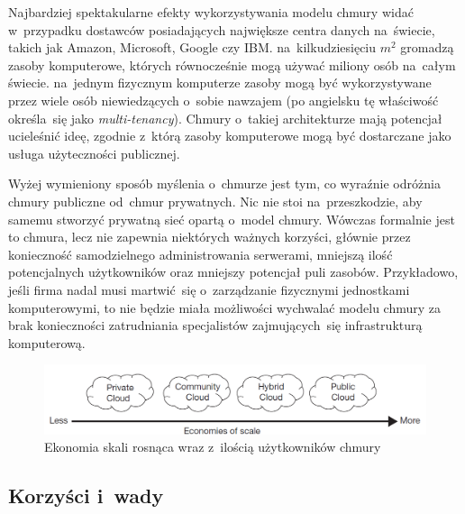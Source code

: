 \documentclass[12pt,a4paper,twoside,titlepage,openright]{book}
\begin{document}
Najbardziej spektakularne efekty wykorzystywania modelu chmury widać w~przypadku dostawców posiadających największe centra danych na~świecie, takich jak Amazon, Microsoft, Google czy IBM. na~kilkudziesięciu $m^{2}$ gromadzą zasoby komputerowe, których równocześnie mogą używać miliony osób na~całym świecie. na~jednym fizycznym komputerze zasoby mogą być wykorzystywane przez wiele osób niewiedzących o~sobie nawzajem (po angielsku tę właściwość określa~się jako \textit{multi-tenancy}). Chmury o~takiej architekturze mają potencjał ucieleśnić ideę, zgodnie z~którą zasoby komputerowe mogą być dostarczane jako usługa użyteczności publicznej.

Wyżej wymieniony sposób myślenia o~chmurze jest tym, co wyraźnie odróżnia chmury publiczne od~chmur prywatnych. Nic nie stoi na~przeszkodzie, aby samemu stworzyć prywatną sieć opartą o~model chmury. Wówczas formalnie jest to chmura, lecz nie zapewnia niektórych ważnych korzyści, głównie przez konieczność samodzielnego administrowania serwerami, mniejszą ilość potencjalnych użytkowników oraz mniejszy potencjał puli zasobów. Przykładowo, jeśli firma nadal musi martwić~się o~zarządzanie fizycznymi jednostkami komputerowymi, to nie będzie miała możliwości wychwalać modelu chmury za brak konieczności zatrudniania specjalistów zajmujących~się infrastrukturą komputerową.

\begin{figure}[h]
	\centering
			\includegraphics[width=\textwidth]{ekonomia-skali.png}
		\caption{Ekonomia skali rosnąca wraz z~ilością użytkowników chmury \cite{ccCambridge}}
		\label{fig:ekonomia-skali}
\end{figure}

\subsection*{Korzyści i~wady}
\end{document}
